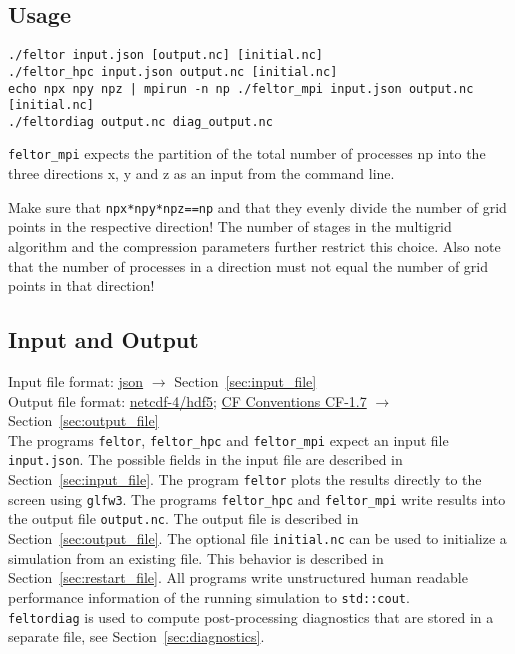 \subsection{Usage}
\begin{verbatim}
./feltor input.json [output.nc] [initial.nc]
./feltor_hpc input.json output.nc [initial.nc]
echo npx npy npz | mpirun -n np ./feltor_mpi input.json output.nc [initial.nc]
./feltordiag output.nc diag_output.nc
\end{verbatim}


\begin{tcolorbox}[title=Note]
    \texttt{feltor_mpi} expects the
partition of the total number of processes np into the three directions x, y and z
as an input from the command line.
\end{tcolorbox}
Make sure that \texttt{npx*npy*npz==np} and that
they evenly divide the number of grid points in the respective direction! The
number of stages in the multigrid algorithm and the compression parameters further
restrict this choice. Also note that the number of processes in a direction must
not equal the number of grid points in that direction!

\subsection{Input and Output}
Input file format: \href{https://en.wikipedia.org/wiki/JSON}{json} $\rightarrow$ Section~\ref{sec:input_file} \\
Output file format: \href{https://www.unidata.ucar.edu/software/netcdf/docs/}{netcdf-4/hdf5};
\href{http://cfconventions.org/Data/cf-conventions/cf-conventions-1.7/cf-conventions.html}{CF Conventions CF-1.7}
 $\rightarrow$ Section~\ref{sec:output_file} \\

 The programs \texttt{feltor}, \texttt{feltor_hpc} and \texttt{feltor_mpi}
 expect an input file \texttt{input.json}.
 The possible fields in the input file are described in Section~\ref{sec:input_file}.
 The program \texttt{feltor} plots the results directly to the screen using \texttt{glfw3}.
 The programs \texttt{feltor_hpc} and \texttt{feltor_mpi} write results into
 the output file \texttt{output.nc}.
 The output file is described in Section~\ref{sec:output_file}.
 The optional file \texttt{initial.nc} can be used to initialize a simulation from an existing file.
 This behavior is described in Section~\ref{sec:restart_file}.
 All programs write unstructured human readable performance information of the running simulation
 to \texttt{std::cout}.
 \\
 \texttt{feltordiag} is used to compute post-processing diagnostics that are
 stored in a separate file, see Section~\ref{sec:diagnostics}.

